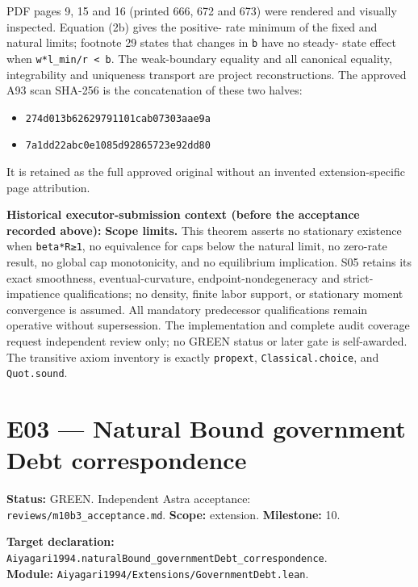 \documentclass[
  11pt,
]{article}
\providecommand{\tightlist}{%
  \setlength{\itemsep}{0pt}\setlength{\parskip}{0pt}}
\let\LedgerOriginalTexttt\texttt
\renewcommand{\texttt}[1]{{\small\LedgerOriginalTexttt{#1}}}
\begin{document}
PDF pages 9, 15 and 16 (printed 666, 672 and 673) were rendered and
visually inspected. Equation (2b) gives the positive- rate minimum of
the fixed and natural limits; footnote 29 states that changes in
\texttt{b} have no steady- state effect when
\texttt{w*l\_min/r\ \textless{}\ b}. The weak-boundary equality and all
canonical equality, integrability and uniqueness transport are project
reconstructions. The approved A93 scan SHA-256 is the concatenation of
these two halves:

\begin{itemize}
\tightlist
\item
  \texttt{274d013b62629791101cab07303aae9a}
\item
  \texttt{7a1dd22abc0e1085d92865723e92dd80}
\end{itemize}

It is retained as the full approved original without an invented
extension-specific page attribution.

\textbf{Historical executor-submission context (before the acceptance
recorded above):} \textbf{Scope limits.} This theorem asserts no
stationary existence when \texttt{beta*R≥1}, no equivalence for caps
below the natural limit, no zero-rate result, no global cap
monotonicity, and no equilibrium implication. S05 retains its exact
smoothness, eventual-curvature, endpoint-nondegeneracy and strict-
impatience qualifications; no density, finite labor support, or
stationary moment convergence is assumed. All mandatory predecessor
qualifications remain operative without supersession. The implementation
and complete audit coverage request independent review only; no GREEN
status or later gate is self-awarded. The transitive axiom inventory is
exactly \texttt{propext}, \texttt{Classical.choice}, and
\texttt{Quot.sound}.

\section{E03 --- Natural Bound government Debt
correspondence}\label{e03-natural-bound-government-debt-correspondence}

\textbf{Status:} GREEN. Independent Astra acceptance:
\texttt{reviews/m10b3\_acceptance.md}. \textbf{Scope:} extension.
\textbf{Milestone:} 10.

\textbf{Target declaration:}
\texttt{Aiyagari1994.naturalBound\_governmentDebt\_correspondence}.\\
\textbf{Module:} \texttt{Aiyagari1994/Extensions/GovernmentDebt.lean}.
\end{document}
